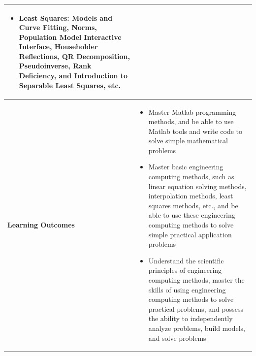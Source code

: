 \documentclass{article}
\begin{document}
\begin{longtable}{|p{3cm}|p{10cm}|}
\begin{itemize}
    \item Least Squares: Models and Curve Fitting, Norms, Population Model Interactive Interface, Householder Reflections, QR Decomposition, Pseudoinverse, Rank Deficiency, and Introduction to Separable Least Squares, etc.
\end{itemize}\\
\hline
\textbf{Learning Outcomes} & 
    \begin{itemize}
        \item Master Matlab programming methods, and be able to use Matlab tools and write code to solve simple mathematical problems
        \item Master basic engineering computing methods, such as linear equation solving methods, interpolation methods, least squares methods, etc., and be able to use these engineering computing methods to solve simple practical application problems
        \item Understand the scientific principles of engineering computing methods, master the skills of using engineering computing methods to solve practical problems, and possess the ability to independently analyze problems, build models, and solve problems
    \end{itemize} \\
\hline
\end{longtable}
\end{document}
